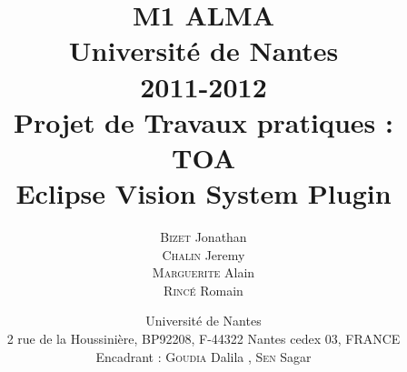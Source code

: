 \documentclass[11pt,a4paper,utf8x]{report}
\title
{
	\normalsize{ M1 ALMA\\ 
	Université de Nantes\\
	2011-2012}\\
	\vspace{15mm}
	\Huge{Projet de Travaux pratiques :\\TOA \\ Eclipse Vision System Plugin}
}
\author{ \textsc{Bizet} Jonathan\\\textsc{Chalin} Jeremy\\ \textsc{Marguerite} Alain\\ \textsc{Rincé} Romain 
	\vspace{30mm}
}
\date
{	
	\normalsize{Université de Nantes \\ 2 rue de la Houssinière, BP92208, F-44322 Nantes cedex 03, FRANCE
	\\ 
	\vspace{5mm}	
	Encadrant : \textsc{Goudia} Dalila , \textsc{Sen} Sagar 
	}
}
\begin{document}
\renewcommand{\labelitemi}{$\bullet$} 	
\maketitle


\clearpage

\tableofcontents
\clearpage

\begin{onehalfspace}


%


\end{onehalfspace}



\listoffigures

\printindex

\appendix



\end{document}
